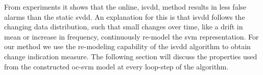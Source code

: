 From experiments it shows that the online, \gls{isvdd}, method results in less false alarms than the static \gls{svdd}.
An explanation for this is that \gls{isvdd} follows the changing data distribution, such that small changes over time, like a drift in mean or increase in frequency, continuously re-model the \gls{svm} representation.
For our method we use the re-modeling capability of the \gls{isvdd} algorithm to obtain change indication measure.
The following section will discuss the properties used from the constructed \gls{oc-svm} model at every loop-step of the algorithm.
